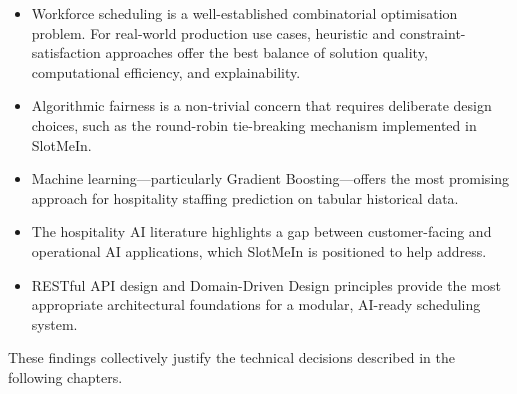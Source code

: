 \documentclass[12pt,a4paper]{report}
\begin{document}
\begin{itemize}
    \item Workforce scheduling is a well-established combinatorial optimisation problem. For real-world production use cases, heuristic and constraint-satisfaction approaches offer the best balance of solution quality, computational efficiency, and explainability.
    \item Algorithmic fairness is a non-trivial concern that requires deliberate design choices, such as the round-robin tie-breaking mechanism implemented in SlotMeIn.
    \item Machine learning—particularly Gradient Boosting—offers the most promising approach for hospitality staffing prediction on tabular historical data.
    \item The hospitality AI literature highlights a gap between customer-facing and operational AI applications, which SlotMeIn is positioned to help address.
    \item RESTful API design and Domain-Driven Design principles provide the most appropriate architectural foundations for a modular, AI-ready scheduling system.
\end{itemize}

These findings collectively justify the technical decisions described in the following chapters.
\end{document}
